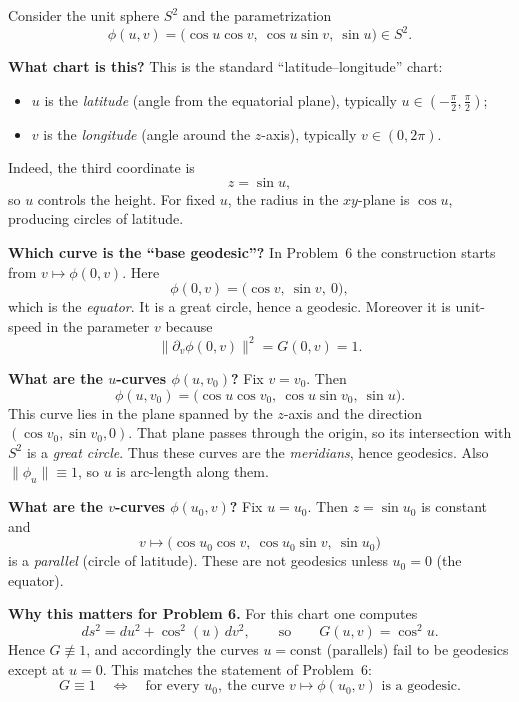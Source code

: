 \documentclass[12pt,a4paper]{article}
\theoremstyle{plain}
\theoremstyle{definition}      %
\begin{document}
	Consider the unit sphere $S^2$ and the parametrization
	\[
	\phi(u,v)=\bigl(\cos u\cos v,\ \cos u\sin v,\ \sin u\bigr)\in S^2.
	\]
	
	\medskip
	\textbf{What chart is this?}
	This is the standard ``latitude--longitude'' chart:
	\begin{itemize}
		\item $u$ is the \emph{latitude} (angle from the equatorial plane), typically $u\in\left(-\frac{\pi}{2},\frac{\pi}{2}\right)$;
		\item $v$ is the \emph{longitude} (angle around the $z$-axis), typically $v\in(0,2\pi)$.
	\end{itemize}
	Indeed, the third coordinate is
	\[
	z=\sin u,
	\]
	so $u$ controls the height. For fixed $u$, the radius in the $xy$-plane is $\cos u$, producing circles of latitude.
	
	\medskip
	\textbf{Which curve is the ``base geodesic''?}
	In Problem~6 the construction starts from $v\mapsto \phi(0,v)$. Here
	\[
	\phi(0,v)=\bigl(\cos v,\ \sin v,\ 0\bigr),
	\]
	which is the \emph{equator}. It is a great circle, hence a geodesic. Moreover it is unit-speed in the parameter $v$
	because
	\[
	\|\partial_v\phi(0,v)\|^2 = G(0,v)=1.
	\]
	
	\medskip
	\textbf{What are the $u$-curves $\phi(u,v_0)$?}
	Fix $v=v_0$. Then
	\[
	\phi(u,v_0)=\bigl(\cos u\cos v_0,\ \cos u\sin v_0,\ \sin u\bigr).
	\]
	This curve lies in the plane spanned by the $z$-axis and the direction $(\cos v_0,\sin v_0,0)$.
	That plane passes through the origin, so its intersection with $S^2$ is a \emph{great circle}.
	Thus these curves are the \emph{meridians}, hence geodesics.
	Also $\|\phi_u\|\equiv 1$, so $u$ is arc-length along them.
	
	\medskip
	\textbf{What are the $v$-curves $\phi(u_0,v)$?}
	Fix $u=u_0$. Then $z=\sin u_0$ is constant and
	\[
	v\longmapsto \bigl(\cos u_0\cos v,\ \cos u_0\sin v,\ \sin u_0\bigr)
	\]
	is a \emph{parallel} (circle of latitude). These are not geodesics unless $u_0=0$ (the equator).
	
	\medskip
	\textbf{Why this matters for Problem 6.}
	For this chart one computes
	\[
	ds^2 = du^2 + \cos^2(u)\,dv^2,
	\qquad\text{so}\qquad
	G(u,v)=\cos^2 u.
	\]
	Hence $G\not\equiv 1$, and accordingly the curves $u=\text{const}$ (parallels) fail to be geodesics except at
	$u=0$. This matches the statement of Problem~6:
	\[
	G\equiv 1
	\quad\Longleftrightarrow\quad
	\text{for every }u_0,\ \text{the curve } v\mapsto \phi(u_0,v)\text{ is a geodesic.}
	\]
	
\end{document}
